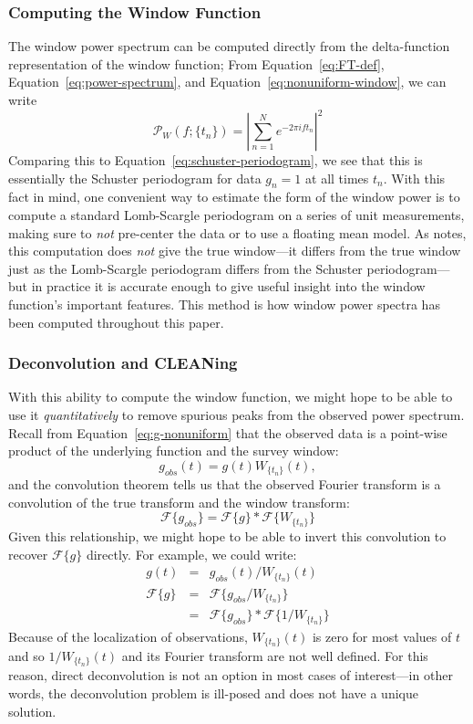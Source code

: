 \documentclass[preprint]{aastex}
\newcommand{\Eq}[1]{Equation~\ref{eq:#1}}
\newcommand{\eq}[1]{\Eq{#1}}
\newcommand{\eqlabel}[1]{\label{eq:#1}}
\newcommand{\sectlabel}[1]{\label{sect:#1}}
\begin{document}
\subsubsection{Computing the Window Function}
The window power spectrum can be computed directly from the
delta-function representation of the window function;
From \eq{FT-def}, \eq{power-spectrum}, and \eq{nonuniform-window},
we can write
\begin{equation}
  \mathcal{P}_W(f;\{t_n\}) = \left|\sum_{n=1}^{N} e^{-2\pi i f t_n}\right|^2
  \eqlabel{window-power-analytic}
\end{equation}
Comparing this to \eq{schuster-periodogram}, we see that this is essentially
the Schuster periodogram for data $g_n=1$ at all times $t_n$.
With this fact in mind, one convenient way to estimate the form of the
window power is to compute a standard Lomb-Scargle periodogram on a series of
unit measurements, making sure to {\it not} pre-center the data or to use a
floating mean model.
As \citet{Scargle82} notes, this computation does {\it not} give the true
window---it differs
from the true window just as the Lomb-Scargle periodogram differs from the
Schuster periodogram---but in practice it is accurate enough to give
useful insight into the window function's important features.
This method is how window power spectra has been computed throughout this
paper.

\subsubsection{Deconvolution and CLEANing}
\sectlabel{CLEAN}
With this ability to compute the window function, we might hope to be able to
use it {\it quantitatively} to remove spurious peaks from the observed
power spectrum.
Recall from \eq{g-nonuniform} that the observed data is a point-wise product
of the underlying function and the survey window:
\begin{equation}
  g_{obs}(t) = g(t)W_{\{t_n\}}(t),
\end{equation}
and the convolution theorem tells us that the observed Fourier transform is
a convolution of the true transform and the window transform:
\begin{equation}
  \mathcal{F}\{g_{obs}\} = \mathcal{F}\{g\} \ast \mathcal{F}\{W_{\{t_n\}}\}
\end{equation}
Given this relationship, we might hope to be able to invert this
convolution to recover $\mathcal{F}\{g\}$ directly.
For example, we could write:
\begin{eqnarray}
  g(t) &=& g_{obs}(t) / W_{\{t_n\}}(t)\nonumber\\
  \mathcal{F}\{g\} &=& \mathcal{F}\{g_{obs}/W_{\{t_n\}}\}\nonumber\\
                   &=& \mathcal{F}\{g_{obs}\} \ast \mathcal{F}\{1/W_{\{t_n\}}\}
\end{eqnarray}
Because of the localization of observations, $W_{\{t_n\}}(t)$ is zero for most
values of $t$ and so $1/W_{\{t_n\}}(t)$ and its Fourier transform are not well
defined. For this reason, direct deconvolution is not an option in most
cases of interest---in other words, the deconvolution problem is ill-posed
and does not have a unique solution.
\end{document}
